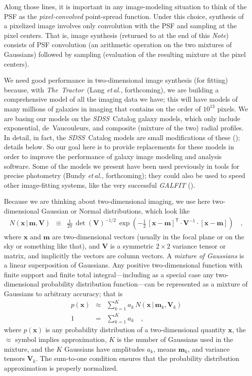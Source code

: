 \documentclass[12pt,pdftex,preprint]{aastex}
\newcommand{\foreign}[1]{\textit{#1}}
\newcommand{\etal}{\foreign{et\,al.}}
\newcommand{\documentname}{\textsl{Note}}
\newcommand{\project}[1]{\textsl{#1}}
\newcommand{\thetractor}{\project{The~Tractor}}
\newcommand{\sdss}{\project{SDSS}}
\newcommand{\tmatrix}[1]{\boldsymbol{#1}}
\newcommand{\inverse}[1]{{#1}^{-1}}
\newcommand{\transpose}[1]{{#1}^{\mathsf T}}
\newcommand{\tvector}[1]{\boldsymbol{#1}}
\newcommand{\pos}{\tvector{x}}
\newcommand{\mean}{\tvector{m}}
\newcommand{\var}{\tmatrix{V}}
\newcommand{\normal}{N}
\newcommand{\given}{\,|\,}
\begin{document}
Along those lines, it is important in any image-modeling situation to
think of the PSF as the \emph{pixel-convolved} point-spread function.
Under this choice, synthesis of a pixelized image involves only
convolution with the PSF and sampling at the pixel centers.  That is,
image synthesis (returned to at the end of this \documentname)
consists of PSF convolution (an arithmetic operation on the two
mixtures of Gaussians) followed by sampling (evaluation of the
resulting mixture at the pixel centers).

We need good performance in two-dimensional image synthesis (for
fitting) because, with \thetractor\ (Lang \etal, forthcoming), we are
building a comprehensive model of all the imaging data we have; this
will have models of many millions of galaxies in imaging that contains
on the order of $10^{13}$ pixels.  We are basing our models on the
\sdss\ Catalog galaxy models, which only include exponential,
de~Vaucouleurs, and composite (mixture of the two) radial profiles.
In detail, in fact, the \sdss\ Catalog models are small modifications
of these (\citealt{lupton}); details below.  So our goal here is to
provide replacements for these models in order to improve the
performance of galaxy image modeling and analysis software.  Some of
the models we present have been used previously in tools for precise
photometry (Bundy \etal, forthcoming); they could also be used to
speed other image-fitting systems, like the very successful
\project{GALFIT} (\citealt{galfit}).

Because we are thinking about two-dimensional imaging, we use here
two-dimensional Gaussian or Normal distributions, which look like
\begin{eqnarray}\displaystyle
\normal(\pos\given\mean,\var) &\equiv& \frac{1}{2\pi}\,\det(\var)^{-1/2}\,\exp(-\frac{1}{2}\,\transpose{[\pos-\mean]}\cdot\inverse{\var}\cdot[\pos-\mean])
\quad ,
\end{eqnarray}
where $\pos$ and $\mean$ are two-dimensional vectors (usually in the
focal plane or on the sky or something like that), and $\var$ is a
symmetric $2\times 2$ variance tensor or matrix, and implicitly the
vectors are column vectors.  A \emph{mixture of Gaussians} is a linear
superposition of Gaussians.  Any positive two-dimensional function
with finite support and finite total integral---including as a special
case any two-dimensional probability distribution function---can be
represented as a mixture of Gaussians to arbitrary accuracy; that is
\begin{eqnarray}
p(\pos) &\approx& \sum_{k=1}^K a_k\,\normal(\pos\given\mean_k,\var_k)
\\
1 &=& \sum_{k=1}^K a_k
\quad ,
\end{eqnarray}
where $p(\pos)$ is any probability distribution of a two-dimensional
quantity $\pos$, the $\approx$ symbol implies approximation, $K$ is
the number of Gaussians used in the mixture, and the $K$ Gaussians
have amplitudes $a_k$, means $\mean_k$, and variance tensors $\var_k$.
The sum-to-one condition ensures that the probability distribution
approximation is properly normalized.
\end{document}
